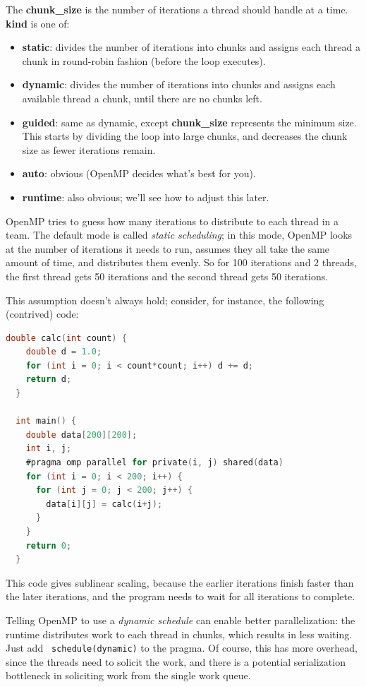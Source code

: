 \documentclass[a4paper]{report}
\begin{document}
    The {\bf chunk\_size} is the number of iterations a thread
      should handle at a time. {\bf kind} is one of:
      \begin{itemize}
        \item {\bf static}:  divides the number of iterations into chunks and assigns each thread
        a chunk in round-robin fashion (before the loop executes).

        \item {\bf dynamic}: divides the number of iterations into chunks and assigns each
        available thread a chunk, until there are no chunks left.
        \item {\bf guided}:  same as dynamic, except {\bf chunk\_size} represents the minimum
        size. This starts by dividing the loop into large chunks, and decreases the
        chunk size as fewer iterations remain.
        \item {\bf auto}: obvious (OpenMP decides what's best for you).
        \item {\bf runtime}: also obvious; we'll see how to adjust this later.
      \end{itemize}

OpenMP tries to guess how many iterations to distribute to each thread
in a team. The default mode is called \emph{static scheduling}; in
this mode, OpenMP looks at the number of iterations it needs to run,
assumes they all take the same amount of time, and distributes them
evenly. So for 100 iterations and 2 threads, the first thread gets 50
iterations and the second thread gets 50 iterations.

This assumption doesn't always hold; consider, for instance, the 
following (contrived) code:
{\small
\begin{lstlisting}[language=C,morekeywords={foreach,pragma,omp,parallel,single,nowait,task,untied,barrier,taskyield}]
  double calc(int count) {
    double d = 1.0;
    for (int i = 0; i < count*count; i++) d += d;
    return d;
  }

  int main() {
    double data[200][200];
    int i, j;
    #pragma omp parallel for private(i, j) shared(data)
    for (int i = 0; i < 200; i++) {
      for (int j = 0; j < 200; j++) {
        data[i][j] = calc(i+j);
      }
    }
    return 0;
  }
\end{lstlisting}
}
This code gives sublinear scaling, because the earlier iterations 
finish faster than the later iterations, and the program needs to wait
for all iterations to complete.

Telling OpenMP to use a \emph{dynamic schedule} can enable better
parallelization: the runtime distributes work to each thread in
chunks, which results in less waiting. Just add {\tt
  schedule(dynamic)} to the pragma. Of course, this has more overhead,
since the threads need to solicit the work, and there is a potential
serialization bottleneck in soliciting work from the single work
queue. 
\end{document}
